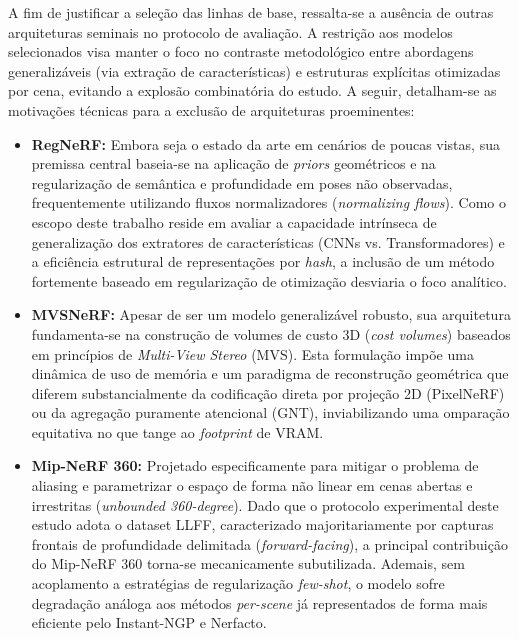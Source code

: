 \documentclass[12pt]{article}
\begin{document}
A fim de justificar a seleção das linhas de base, ressalta-se a ausência de outras arquiteturas seminais no protocolo de avaliação. A restrição aos modelos selecionados visa manter o foco no contraste metodológico entre abordagens generalizáveis (via extração de características) e estruturas explícitas otimizadas por cena, evitando a explosão combinatória do estudo. A seguir, detalham-se as motivações técnicas para a exclusão de arquiteturas proeminentes:

\begin{itemize}
    \item \textbf{RegNeRF:} Embora seja o estado da arte em cenários de poucas vistas, sua premissa central baseia-se na aplicação de \textit{priors} geométricos e na regularização de semântica e profundidade em poses não observadas, frequentemente utilizando fluxos normalizadores (\textit{normalizing flows}). Como o escopo deste trabalho reside em avaliar a capacidade intrínseca de generalização dos extratores de características (CNNs vs. Transformadores) e a eficiência estrutural de representações por \textit{hash}, a inclusão de um método fortemente baseado em regularização de otimização desviaria o foco analítico.
    
    \item \textbf{MVSNeRF:} Apesar de ser um modelo generalizável robusto, sua arquitetura fundamenta-se na construção de volumes de custo 3D (\textit{cost volumes}) baseados em princípios de \textit{Multi-View Stereo} (MVS). Esta formulação impõe uma dinâmica de uso de memória e um paradigma de reconstrução geométrica que diferem substancialmente da codificação direta por projeção 2D (PixelNeRF) ou da agregação puramente atencional (GNT), inviabilizando uma omparação equitativa no que tange ao \textit{footprint} de VRAM.
    
    \item \textbf{Mip-NeRF 360:} Projetado especificamente para mitigar o problema de aliasing e parametrizar o espaço de forma não linear em cenas abertas e irrestritas (\textit{unbounded 360-degree}). Dado que o protocolo experimental deste estudo adota o dataset LLFF, caracterizado majoritariamente por capturas frontais de profundidade delimitada (\textit{forward-facing}), a principal contribuição do Mip-NeRF 360 torna-se mecanicamente subutilizada. Ademais, sem acoplamento a estratégias de regularização \textit{few-shot}, o modelo sofre degradação análoga aos métodos \textit{per-scene} já representados de forma mais eficiente pelo Instant-NGP e Nerfacto.
\end{itemize}
\end{document}
